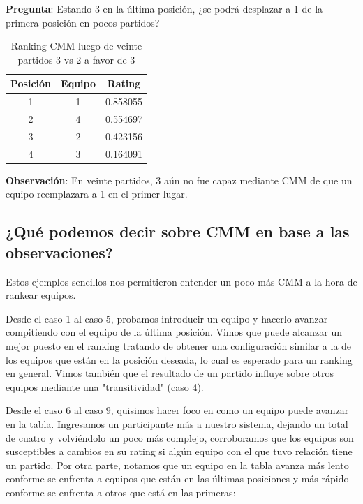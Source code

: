 \textbf{Pregunta}: Estando 3 en la última posición, ¿se podrá desplazar a 1 de la primera posición en pocos partidos?

\begin{table}[h!]
    \begin{center}
        \begin{tabular}{|c|c|c|}
        \hline
        \textbf{Posición} & \textbf{Equipo} & \textbf{Rating} \\
        \hline
        1 & 1 & 0.858055\\
        2 & 4 & 0.554697\\
        3 & 2 & 0.423156\\
        4 & 3 & 0.164091\\
        \hline
        \end{tabular}
        \caption{Ranking CMM luego de veinte partidos 3 vs 2 a favor de 3}
        \label{cmm_caso_9}
    \end{center}
\end{table}

\textbf{Observación}: En veinte partidos, 3 aún no fue capaz mediante CMM de que un equipo reemplazara a 1 en el primer lugar.

\newpage
\subsection{¿Qué podemos decir sobre CMM en base a las observaciones?}\label{conclusion_observaciones}

Estos ejemplos sencillos nos permitieron entender un poco más CMM a la hora de rankear equipos.

Desde el caso 1 al caso 5, probamos introducir un equipo y hacerlo avanzar compitiendo con el equipo de la última posición. Vimos que puede alcanzar un mejor puesto en el ranking tratando de obtener una configuración similar a la de los equipos que están en la posición deseada, lo cual es esperado para un ranking en general. Vimos también que el resultado de un partido influye sobre otros equipos mediante una "transitividad" (caso 4).

Desde el caso 6 al caso 9, quisimos hacer foco en como un equipo puede avanzar en la tabla. Ingresamos un participante más a nuestro sistema, dejando un total de cuatro y volviéndolo un poco más complejo, corroboramos que los equipos son susceptibles a cambios en su rating si algún equipo con el que tuvo relación tiene un partido. Por otra parte, notamos que un equipo en la tabla avanza más lento conforme se enfrenta a equipos que están en las últimas posiciones y más rápido conforme se enfrenta a otros que está en las primeras:

